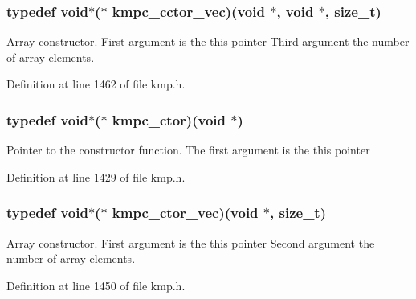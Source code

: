 \hypertarget{group__THREADPRIVATE_gaf9503cacabf6cf90ed34f2727fc480bc}{
\subsubsection[{kmpc\-\_\-cctor\-\_\-vec}]{\setlength{\rightskip}{0pt plus 5cm}typedef void$\ast$($\ast$ kmpc\-\_\-cctor\-\_\-vec)(void $\ast$, void $\ast$, size\-\_\-t)}}\label{group__THREADPRIVATE_gaf9503cacabf6cf90ed34f2727fc480bc}
Array constructor. First argument is the {\ttfamily this} pointer Third argument the number of array elements. 

Definition at line 1462 of file kmp.\-h.

\hypertarget{group__THREADPRIVATE_ga0c2f8074a8474eee42bc96a4bdc7679a}{
\subsubsection[{kmpc\-\_\-ctor}]{\setlength{\rightskip}{0pt plus 5cm}typedef void$\ast$($\ast$ kmpc\-\_\-ctor)(void $\ast$)}}\label{group__THREADPRIVATE_ga0c2f8074a8474eee42bc96a4bdc7679a}
Pointer to the constructor function. The first argument is the {\ttfamily this} pointer 

Definition at line 1429 of file kmp.\-h.

\hypertarget{group__THREADPRIVATE_gac1f868aef7d531d34b91eaa57e339f21}{
\subsubsection[{kmpc\-\_\-ctor\-\_\-vec}]{\setlength{\rightskip}{0pt plus 5cm}typedef void$\ast$($\ast$ kmpc\-\_\-ctor\-\_\-vec)(void $\ast$, size\-\_\-t)}}\label{group__THREADPRIVATE_gac1f868aef7d531d34b91eaa57e339f21}
Array constructor. First argument is the {\ttfamily this} pointer Second argument the number of array elements. 

Definition at line 1450 of file kmp.\-h.

